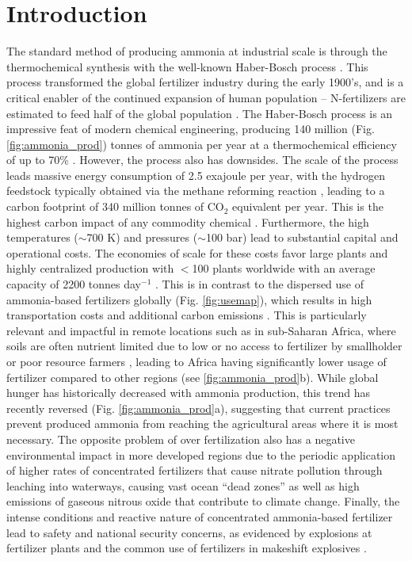 \section{Introduction}

The standard method of producing ammonia at industrial scale is through the thermochemical synthesis with the well-known Haber-Bosch process \cite{Schloegl_2003}. This process transformed the global fertilizer industry during the early 1900's, and is a critical enabler of the continued expansion of human population \cite{Smil_1999} -- N-fertilizers are estimated to feed half of the global population \cite{Zhang_2015}. The Haber-Bosch process is an impressive feat of modern chemical engineering, producing 140 million (Fig. \ref{fig:ammonia_prod}) tonnes of ammonia per year at a thermochemical efficiency of up to 70\% \cite{Schloegl_2003,Schiffer_2017}. However, the process also has downsides. The scale of the process leads massive energy consumption of 2.5 exajoule per year, with the hydrogen feedstock typically obtained via the methane reforming reaction \cite{Abbas_2010}, leading to a carbon footprint of 340 million tonnes of CO$_2$ equivalent per year. This is the highest carbon impact of any commodity chemical \cite{Schiffer_2017}. Furthermore, the high temperatures ($\sim$700 K) and pressures ($\sim$100 bar) lead to substantial capital and operational costs. The economies of scale for these costs favor large plants and highly centralized production with $<$100 plants worldwide with an average capacity of 2200 tonnes day$^{-1}$ \cite{McArthur_2017, Bartels}. This is in contrast to the dispersed use of ammonia-based fertilizers globally (Fig. \ref{fig:usemap}), which results in high transportation costs and additional carbon emissions \cite{West_2002}. This is particularly relevant and impactful in remote locations such as in sub-Saharan Africa, where soils are often nutrient limited due to low or no access to fertilizer by smallholder or poor resource farmers \cite{Gilbert_2012, Mueller_2012, VanderVelde2014, Liu2016}, leading to Africa having significantly lower usage of fertilizer compared to other regions (see \ref{fig:ammonia_prod}b). While global hunger has historically decreased with ammonia production, this trend has recently reversed (Fig. \ref{fig:ammonia_prod}a), suggesting that current practices prevent produced ammonia from reaching the agricultural areas where it is most necessary. The opposite problem of over fertilization also has a negative environmental impact in more developed regions due to the periodic application of higher rates of concentrated fertilizers that cause nitrate pollution through leaching into waterways, causing vast ocean ``dead zones'' \cite{Diaz2008, Stevens_2019} as well as high emissions of gaseous nitrous oxide that contribute to climate change. Finally, the intense conditions and reactive nature of concentrated ammonia-based fertilizer lead to safety and national security concerns, as evidenced by explosions at fertilizer plants and the common use of fertilizers in makeshift explosives \cite{Marlair_2005}.

